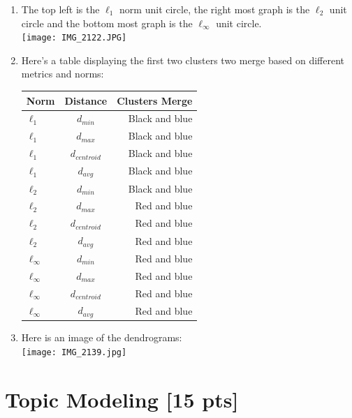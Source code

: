 \documentclass[submit]{harvardml}
\begin{document}
	\begin{enumerate}
		
		\item The top left is the $\ell_1$ norm unit circle, the right most graph is the $\ell_2$ unit circle and the bottom most graph is the $\ell_\infty$ unit circle.  \\ 
		
		\texttt{[image: IMG\_2122.JPG]}
		
		\item Here's a table displaying the first two clusters two merge based on different metrics and norms: \\
		\begin{tabular}{l | c | r}
			
			Norm & Distance & Clusters Merge \\
			\hline
			$\ell_1$ & $d_{min}$ & Black and blue \\
			$\ell_1$ & $d_{max}$ & Black and blue \\
			$\ell_1$ & $d_{centroid}$ & Black and blue \\
			$\ell_1$ & $d_{avg}$ & Black and blue \\
			
			$\ell_2$ & $d_{min}$ & Black and blue \\
			$\ell_2$ & $d_{max}$ & Red and blue \\
			$\ell_2$ & $d_{centroid}$ & Red and blue \\
			$\ell_2$ & $d_{avg}$ & Red and blue \\
			
			$\ell_\infty$ & $d_{min}$ & Red and blue \\
			$\ell_\infty$ & $d_{max}$ & Red and blue \\
			$\ell_\infty$ & $d_{centroid}$ & Red and blue \\
			$\ell_\infty$ & $d_{avg}$ & Red and blue \\
			
		\end{tabular}
		
		\item Here is an image of the dendrograms: \\
		\texttt{[image: IMG\_2139.jpg]}
	\end{enumerate}
	
	
	
	\newpage 
	\section*{Topic Modeling [15 pts]}
	
\end{document}
